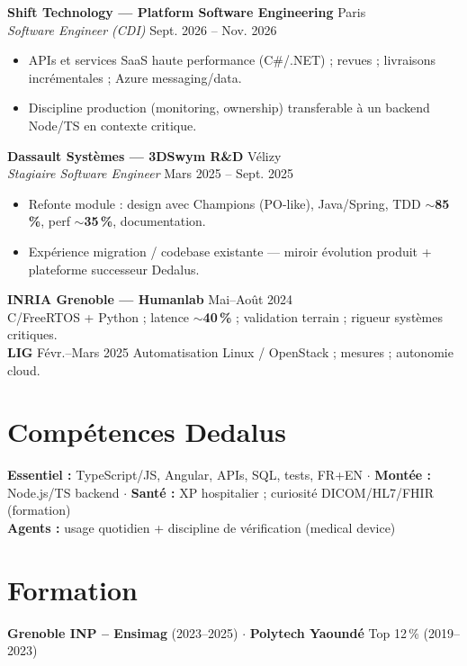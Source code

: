 \documentclass[10pt,a4paper]{article}
\begin{document}
\textbf{Shift Technology --- Platform Software Engineering} \hfill Paris\\
\textit{Software Engineer (CDI)} \hfill Sept. 2026 -- Nov. 2026
\begin{itemize}
  \item APIs et services SaaS haute performance (C\#/.NET) ; revues ; livraisons incr\'ementales ; Azure messaging/data.
  \item Discipline production (monitoring, ownership) transferable \`a un backend Node/TS en contexte critique.
\end{itemize}

\textbf{Dassault Syst\`emes --- 3DSwym R\&D} \hfill V\'elizy\\
\textit{Stagiaire Software Engineer} \hfill Mars 2025 -- Sept. 2025
\begin{itemize}
  \item Refonte module : design avec Champions (PO-like), Java/Spring, TDD $\sim$\textbf{85\,\%}, perf $\sim$\textbf{35\,\%}, documentation.
  \item Exp\'erience migration / codebase existante --- miroir \'evolution produit + plateforme successeur Dedalus.
\end{itemize}

\textbf{INRIA Grenoble --- Humanlab} \hfill Mai--Ao\^ut 2024\\
C/FreeRTOS + Python ; latence $\sim$\textbf{40\,\%} ; validation terrain ; rigueur syst\`emes critiques.\\[1pt]
\textbf{LIG} \hfill F\'evr.--Mars 2025 \quad Automatisation Linux / OpenStack ; mesures ; autonomie cloud.

\section{Comp\'etences Dedalus}
\textbf{Essentiel :} TypeScript/JS, Angular, APIs, SQL, tests, FR+EN $\cdot$
\textbf{Mont\'ee :} Node.js/TS backend $\cdot$
\textbf{Sant\'e :} XP hospitalier ; curiosit\'e DICOM/HL7/FHIR (formation)\\
\textbf{Agents :} usage quotidien + discipline de v\'erification (medical device)

\section{Formation}
\textbf{Grenoble INP -- Ensimag} (2023--2025) $\cdot$ \textbf{Polytech Yaound\'e} Top 12\,\% (2019--2023)
\end{document}
